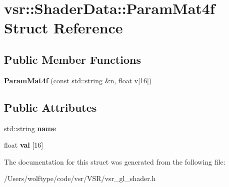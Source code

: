 \hypertarget{structvsr_1_1_shader_data_1_1_param_mat4f}{\section{vsr\-:\-:Shader\-Data\-:\-:Param\-Mat4f Struct Reference}
\label{structvsr_1_1_shader_data_1_1_param_mat4f}
}
\subsection*{Public Member Functions}
\begin{DoxyCompactItemize}
\item 
\hypertarget{structvsr_1_1_shader_data_1_1_param_mat4f_a2944a681cd5c58c0d82ef3fa1ea87fd9}{{\bfseries Param\-Mat4f} (const std\-::string \&n, float v\mbox{[}16\mbox{]})}\label{structvsr_1_1_shader_data_1_1_param_mat4f_a2944a681cd5c58c0d82ef3fa1ea87fd9}

\end{DoxyCompactItemize}
\subsection*{Public Attributes}
\begin{DoxyCompactItemize}
\item 
\hypertarget{structvsr_1_1_shader_data_1_1_param_mat4f_ad8697c21c1790b8068ba824430bf03bf}{std\-::string {\bfseries name}}\label{structvsr_1_1_shader_data_1_1_param_mat4f_ad8697c21c1790b8068ba824430bf03bf}

\item 
\hypertarget{structvsr_1_1_shader_data_1_1_param_mat4f_a07f700434a1871181cc2850052253e95}{float {\bfseries val} \mbox{[}16\mbox{]}}\label{structvsr_1_1_shader_data_1_1_param_mat4f_a07f700434a1871181cc2850052253e95}

\end{DoxyCompactItemize}


The documentation for this struct was generated from the following file\-:\begin{DoxyCompactItemize}
\item 
/\-Users/wolftype/code/vsr/\-V\-S\-R/vsr\-\_\-gl\-\_\-shader.\-h\end{DoxyCompactItemize}

